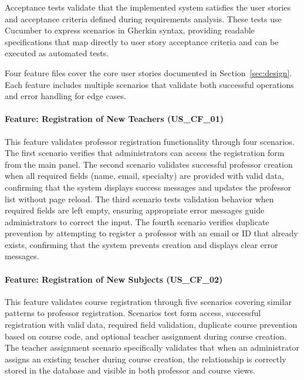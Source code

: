 \documentclass[12pt,a4paper]{article}
\begin{document}
Acceptance tests validate that the implemented system satisfies the user stories and acceptance criteria defined during requirements analysis. These tests use Cucumber to express scenarios in Gherkin syntax, providing readable specifications that map directly to user story acceptance criteria and can be executed as automated tests.\newline

Four feature files cover the core user stories documented in Section~\ref{sec:design}. Each feature includes multiple scenarios that validate both successful operations and error handling for edge cases.

\paragraph{Feature: Registration of New Teachers (US\_CF\_01)}

This feature validates professor registration functionality through four scenarios. The first scenario verifies that administrators can access the registration form from the main panel. The second scenario validates successful professor creation when all required fields (name, email, specialty) are provided with valid data, confirming that the system displays success messages and updates the professor list without page reload. The third scenario tests validation behavior when required fields are left empty, ensuring appropriate error messages guide administrators to correct the input. The fourth scenario verifies duplicate prevention by attempting to register a professor with an email or ID that already exists, confirming that the system prevents creation and displays clear error messages.\newline

\paragraph{Feature: Registration of New Subjects (US\_CF\_02)}

This feature validates course registration through five scenarios covering similar patterns to professor registration. Scenarios test form access, successful registration with valid data, required field validation, duplicate course prevention based on course code, and optional teacher assignment during course creation. The teacher assignment scenario specifically validates that when an administrator assigns an existing teacher during course creation, the relationship is correctly stored in the database and visible in both professor and course views.\newline
\end{document}
